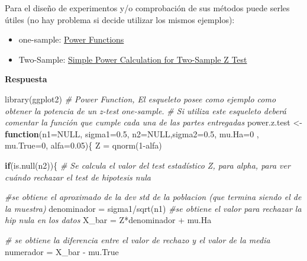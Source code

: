 \documentclass[]{article}
\newenvironment{Shaded}{\begin{snugshade}}{\end{snugshade}}
\newcommand{\AttributeTok}[1]{\textcolor[rgb]{0.77,0.63,0.00}{#1}}
\newcommand{\CommentTok}[1]{\textcolor[rgb]{0.56,0.35,0.01}{\textit{#1}}}
\newcommand{\ConstantTok}[1]{\textcolor[rgb]{0.00,0.00,0.00}{#1}}
\newcommand{\ControlFlowTok}[1]{\textcolor[rgb]{0.13,0.29,0.53}{\textbf{#1}}}
\newcommand{\DecValTok}[1]{\textcolor[rgb]{0.00,0.00,0.81}{#1}}
\newcommand{\FloatTok}[1]{\textcolor[rgb]{0.00,0.00,0.81}{#1}}
\newcommand{\FunctionTok}[1]{\textcolor[rgb]{0.00,0.00,0.00}{#1}}
\newcommand{\NormalTok}[1]{#1}
\newcommand{\OtherTok}[1]{\textcolor[rgb]{0.56,0.35,0.01}{#1}}
\newcommand{\SpecialCharTok}[1]{\textcolor[rgb]{0.00,0.00,0.00}{#1}}
\providecommand{\tightlist}{%
  \setlength{\itemsep}{0pt}\setlength{\parskip}{0pt}}
\begin{document}
Para el diseño de experimentos y/o comprobación de sus métodos puede
serles útiles (no hay problema si decide utilizar los mismos ejemplos):

\begin{itemize}
\tightlist
\item
  one-sample:
  \href{https://online.stat.psu.edu/stat415/lesson/25/25.2}{Power
  Functions}
\item
  Two-Sample:
  \href{https://ytliu0.github.io/Stat_Med/power2.html}{Simple Power
  Calculation for Two-Sample Z Test}
\end{itemize}

\textbf{Respuesta}

\begin{Shaded}
\begin{Highlighting}[]
\FunctionTok{library}\NormalTok{(ggplot2)}
\CommentTok{\# Power Function, El esqueleto posee como ejemplo como obtener la potencia de un z{-}test one{-}sample.}
\CommentTok{\# Si utiliza este esqueleto deberá comentar la función que cumple cada una de las partes entregadas}
\NormalTok{power.z.test }\OtherTok{\textless{}{-}} \ControlFlowTok{function}\NormalTok{(}\AttributeTok{n1=}\ConstantTok{NULL}\NormalTok{, }\AttributeTok{sigma1=}\FloatTok{0.5}\NormalTok{, }
                         \AttributeTok{n2=}\ConstantTok{NULL}\NormalTok{,}\AttributeTok{sigma2=}\FloatTok{0.5}\NormalTok{, }\AttributeTok{mu.Ha=}\DecValTok{0}\NormalTok{ , }
                         \AttributeTok{mu.True=}\DecValTok{0}\NormalTok{, }\AttributeTok{alfa=}\FloatTok{0.05}\NormalTok{)\{}
\NormalTok{  Z }\OtherTok{=} \FunctionTok{qnorm}\NormalTok{(}\DecValTok{1}\SpecialCharTok{{-}}\NormalTok{alfa)}
  
  \ControlFlowTok{if}\NormalTok{(}\FunctionTok{is.null}\NormalTok{(n2))\{}
    \CommentTok{\# Se calcula el valor del test estadístico Z, para alpha, para ver cuándo rechazar el test de        hipotesis nula}
    
    
    \CommentTok{\#se obtiene el aproximado de la dev std de la poblacion (que termina siendo el de la muestra)}
\NormalTok{    denominador }\OtherTok{=}\NormalTok{ sigma1}\SpecialCharTok{/}\FunctionTok{sqrt}\NormalTok{(n1)}
    \CommentTok{\#se obtiene el valor para rechazar la hip nula en los datos}
\NormalTok{    X\_bar }\OtherTok{=}\NormalTok{ Z}\SpecialCharTok{*}\NormalTok{denominador }\SpecialCharTok{+}\NormalTok{ mu.Ha}
    
    \CommentTok{\# se obtiene la diferencia entre el valor de rechazo y el valor de la media}
\NormalTok{    numerador }\OtherTok{=}\NormalTok{ X\_bar }\SpecialCharTok{{-}}\NormalTok{ mu.True}
    

\end{Highlighting}
\end{Shaded}
\end{document}
